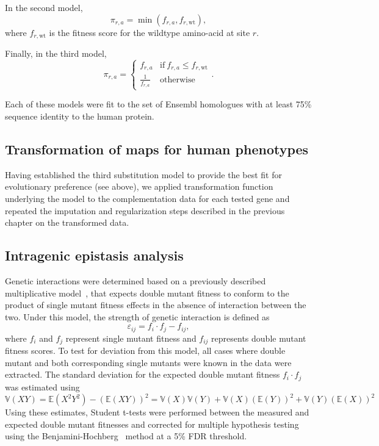 In the second model, $$\pi_{r,a} = \min(f_{r,a}, f_{r,\text{wt}}),$$ where $f_{r,\text{wt}}$ is the fitness score for the wildtype amino-acid at site $r$. 

Finally, in the third model, $$\pi_{r,a} = \begin{cases} f_{r,a} &  \text{if}~ f_{r,a} \le f_{r,\text{wt}} \\ \frac{1}{f_{r,a}} & \text{otherwise} \end{cases}. $$ 

Each of these models were fit to the set of Ensembl homologues with at least 75\% sequence identity to the human protein. 

\subsection{Transformation of maps for human phenotypes}
Having established the third substitution model to provide the best fit for evolutionary preference (see above), we applied transformation function underlying the model to the complementation data for each tested gene and repeated the imputation and regularization steps described in the previous chapter on the transformed data.

\subsection{Intragenic epistasis analysis} Genetic interactions were determined based on a previously described multiplicative model~\cite{phillips_language_1998,onge_systematic_2007}, that expects double mutant fitness to conform to the product of single mutant fitness effects in the absence of interaction between the two. Under this model, the strength of genetic interaction is defined as $$\varepsilon_{ij} = f_i \cdot f_j - f_{ij},$$ where $f_i$ and $f_j$ represent single mutant fitness and $f_{ij}$ represents double mutant fitness scores. To test for deviation from this model, all cases where double mutant and both corresponding single mutants were known in the data were extracted. The standard deviation for the expected double mutant fitness $f_i \cdot f_j$ was estimated using
$$ \mathbb{V}(XY) = \mathbb{E}(X^2Y^2)-(\mathbb{E}(XY))^2=\mathbb{V}(X)\mathbb{V}(Y) + \mathbb{V}(X)(\mathbb{E}(Y))^2+\mathbb{V}(Y)(\mathbb{E}(X))^2 $$ 
Using these estimates, Student t-tests were performed between the measured and expected double mutant fitnesses and corrected for multiple hypothesis testing using the  Benjamini-Hochberg~\cite{benjamini_controlling_1995} method at a 5\% FDR threshold.

